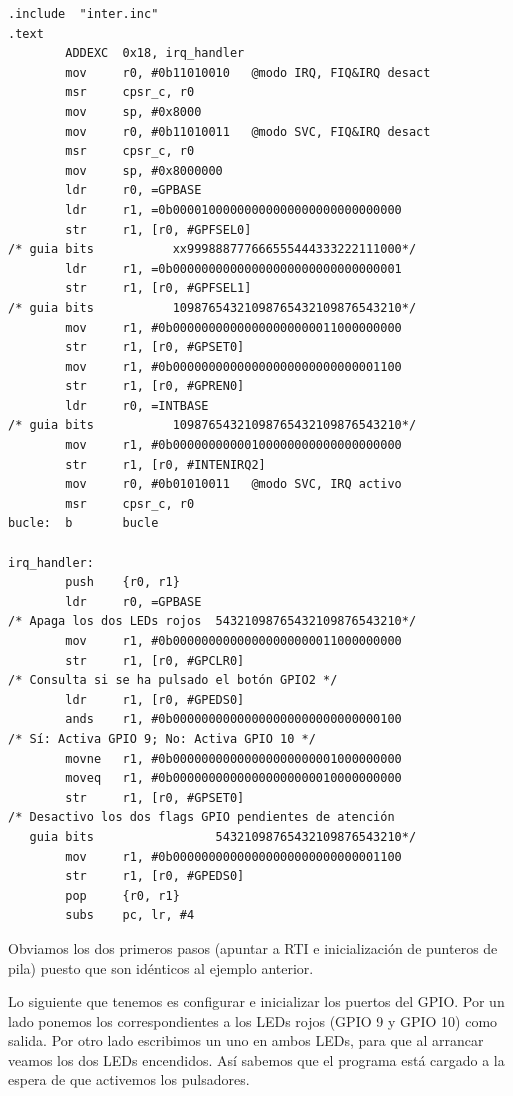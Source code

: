 \begin{lstlisting}[caption={inter3.s},label={lst:codigoPract5_3}]
        .include  "inter.inc"
.text
        ADDEXC  0x18, irq_handler
        mov     r0, #0b11010010   @modo IRQ, FIQ&IRQ desact
        msr     cpsr_c, r0
        mov     sp, #0x8000
        mov     r0, #0b11010011   @modo SVC, FIQ&IRQ desact
        msr     cpsr_c, r0
        mov     sp, #0x8000000
        ldr     r0, =GPBASE
        ldr     r1, =0b00001000000000000000000000000000
        str     r1, [r0, #GPFSEL0]
/* guia bits           xx999888777666555444333222111000*/
        ldr     r1, =0b00000000000000000000000000000001
        str     r1, [r0, #GPFSEL1]
/* guia bits           10987654321098765432109876543210*/
        mov     r1, #0b00000000000000000000011000000000
        str     r1, [r0, #GPSET0]
        mov     r1, #0b00000000000000000000000000001100
        str     r1, [r0, #GPREN0]
        ldr     r0, =INTBASE
/* guia bits           10987654321098765432109876543210*/
        mov     r1, #0b00000000000100000000000000000000
        str     r1, [r0, #INTENIRQ2]
        mov     r0, #0b01010011   @modo SVC, IRQ activo
        msr     cpsr_c, r0
bucle:  b       bucle

irq_handler:
        push    {r0, r1}
        ldr     r0, =GPBASE
/* Apaga los dos LEDs rojos  54321098765432109876543210*/
        mov     r1, #0b00000000000000000000011000000000
        str     r1, [r0, #GPCLR0]
/* Consulta si se ha pulsado el botón GPIO2 */
        ldr     r1, [r0, #GPEDS0]
        ands    r1, #0b00000000000000000000000000000100
/* Sí: Activa GPIO 9; No: Activa GPIO 10 */
        movne   r1, #0b00000000000000000000001000000000
        moveq   r1, #0b00000000000000000000010000000000
        str     r1, [r0, #GPSET0]
/* Desactivo los dos flags GPIO pendientes de atención
   guia bits                 54321098765432109876543210*/
        mov     r1, #0b00000000000000000000000000001100
        str     r1, [r0, #GPEDS0]
        pop     {r0, r1}
        subs    pc, lr, #4
\end{lstlisting}

Obviamos los dos primeros pasos (apuntar a RTI e inicialización de punteros de pila) puesto
que son idénticos al ejemplo anterior.

Lo siguiente que tenemos es configurar e inicializar los puertos del GPIO. Por un lado
ponemos los correspondientes a los LEDs rojos (GPIO 9 y GPIO 10) como salida. Por otro
lado escribimos un uno en ambos LEDs, para que al arrancar veamos los dos LEDs encendidos.
Así sabemos que el programa está cargado a la espera de que activemos los pulsadores.

